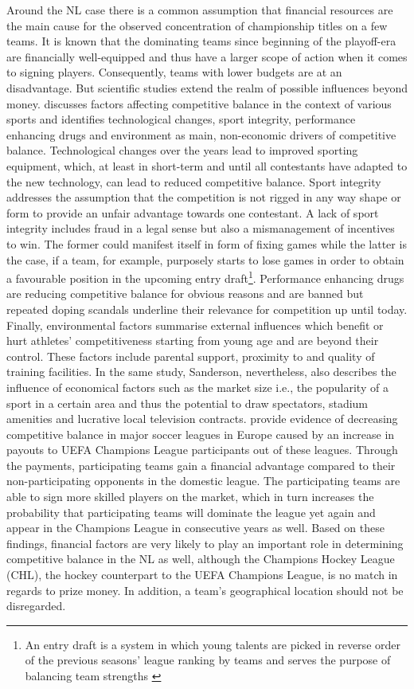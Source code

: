 \documentclass[12pt, a4paper]{article}
\begin{document}
Around the NL case there is a common assumption that financial resources are the main cause for the observed concentration of championship titles on a few teams. It is known that the dominating teams since beginning of the playoff-era are financially well-equipped and thus have a larger scope of action when it comes to signing players. Consequently, teams with lower budgets are at an disadvantage. But scientific studies extend the realm of possible influences beyond money. \citet{sanderson_many_2002} discusses factors affecting competitive balance in the context of various sports and identifies technological changes, sport integrity, performance enhancing drugs and environment as main, non-economic drivers of competitive balance. Technological changes over the years lead to improved sporting equipment, which, at least in short-term and until all contestants have adapted to the new technology, can lead to reduced competitive balance. Sport integrity addresses the assumption that the competition is not rigged in any way shape or form to provide an unfair advantage towards one contestant. A lack of sport integrity includes fraud in a legal sense but also a mismanagement of incentives to win. The former could manifest itself in form of fixing games while the latter is the case, if a team, for example, purposely starts to lose games in order to obtain a favourable position in the upcoming entry draft\footnote{An entry draft is a system in which young talents are picked in reverse order of the previous seasons’ league ranking by teams and serves the purpose of balancing team strengths \citep[see][]{szymanski_economic_2003}}. Performance enhancing drugs are reducing competitive balance for obvious reasons and are banned but repeated doping scandals underline their relevance for competition up until today. Finally, environmental factors summarise external influences which benefit or hurt athletes’ competitiveness starting from young age and are beyond their control. These factors include parental support, proximity to and quality of training facilities. In the same study, Sanderson, nevertheless, also describes the influence of economical factors such as the market size i.e., the popularity of a sport in a certain area and thus the potential to draw spectators, stadium amenities and lucrative local television contracts. \citet{pawlowski_top_2010} provide evidence of decreasing competitive balance in major soccer leagues in Europe caused by an increase in payouts to UEFA Champions League participants out of these leagues. Through the payments, participating teams gain a financial advantage compared to their non-participating opponents in the domestic league. The participating teams are able to sign more skilled players on the market, which in turn increases the probability that participating teams will dominate the league yet again and appear in the Champions League in consecutive years as well. Based on these findings, financial factors are very likely to play an important role in determining competitive balance in the NL as well, although the Champions Hockey League (CHL), the hockey counterpart to the UEFA Champions League, is no match in regards to prize money. In addition, a team's geographical location should not be disregarded. 
\end{document}
